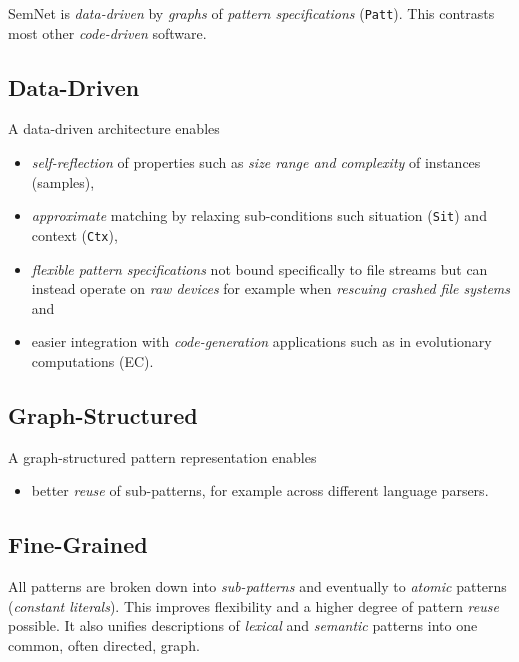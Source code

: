 \documentclass[a4paper,10pt,twocolumn]{article}
\newcommand{\codeCxxClass}[1]{\lstset{language=C++}\lstinline!#1!}
\newcommand{\hrefn}[2]{\href{#1}{#2}\footnote{See {\texttt #1}}} %
\newcommand{\sn}[0]{SemNet}
\begin{document}


\sn{} is \emph{data-driven} by \emph{graphs} of \emph{pattern specifications}
(\codeCxxClass{Patt}). This contrasts most other \emph{code-driven} software.

\subsection{Data-Driven}
A data-driven architecture enables
\begin{itemize}
\item \emph{self-reflection} of properties such as \emph{size range and
    complexity} of instances (samples),
\item \emph{approximate} matching by relaxing sub-conditions such situation
  (\codeCxxClass{Sit}) and context (\codeCxxClass{Ctx}),
\item \emph{flexible pattern specifications} not bound specifically to file
  streams but can instead operate on \emph{raw devices} for example when
  \emph{rescuing crashed file systems} and
\item easier integration with \emph{code-generation} applications such as in
  evolutionary computations (EC).
\end{itemize}

\subsection{Graph-Structured}
A graph-structured pattern representation enables
\begin{itemize}
\item better \emph{reuse} of sub-patterns, for example across different language
  parsers.
\end{itemize}

\subsection{Fine-Grained}

All patterns are broken down into \emph{sub-patterns} and eventually to
\emph{atomic} patterns (\emph{constant literals}). This improves flexibility and
a higher degree of pattern \emph{reuse} possible. It also unifies descriptions of
\emph{lexical} and \emph{semantic} patterns into one common, often directed, graph.
\end{document}

